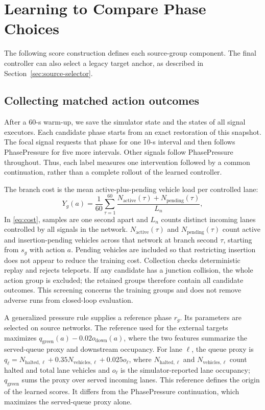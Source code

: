 \section{Learning to Compare Phase Choices}
The following score construction defines each source-group component. The final controller can also select a legacy target anchor, as described in Section~\ref{sec:source-selector}.
\subsection{Collecting matched action outcomes}
After a 60-s warm-up, we save the simulator state and the states of all signal executors. Each candidate phase starts from an exact restoration of this snapshot. The focal signal requests that phase for one 10-s interval and then follows PhasePressure for five more intervals. Other signals follow PhasePressure throughout. Thus, each label measures one intervention followed by a common continuation, rather than a complete rollout of the learned controller.

The branch cost is the mean active-plus-pending vehicle load per controlled lane:
\begin{equation}
 Y_g(a)=\frac{1}{60}\sum_{\tau=1}^{60}
 \frac{N_{\mathrm{active}}(\tau)+N_{\mathrm{pending}}(\tau)}{L_n},
 \label{eq:cost}
\end{equation}
In \eqref{eq:cost}, samples are one second apart and $L_n$ counts distinct incoming lanes controlled by all signals in the network. $N_{\mathrm{active}}(\tau)$ and $N_{\mathrm{pending}}(\tau)$ count active and insertion-pending vehicles across that network at branch second $\tau$, starting from $s_g$ with action $a$. Pending vehicles are included so that restricting insertion does not appear to reduce the training cost. Collection checks deterministic replay and rejects teleports. If any candidate has a junction collision, the whole action group is excluded; the retained groups therefore contain all candidate outcomes. This screening concerns the training groups and does not remove adverse runs from closed-loop evaluation.

A generalized pressure rule supplies a reference phase $r_g$. Its parameters are selected on source networks. The reference used for the external targets maximizes $q_{\mathrm{green}}(a)-0.02o_{\mathrm{down}}(a)$, where the two features summarize the served-queue proxy and downstream occupancy. For lane $\ell$, the queue proxy is $q_\ell=N_{\mathrm{halted},\ell}+0.35N_{\mathrm{vehicles},\ell}+0.025o_\ell$, where $N_{\mathrm{halted},\ell}$ and $N_{\mathrm{vehicles},\ell}$ count halted and total lane vehicles and $o_\ell$ is the simulator-reported lane occupancy; $q_{\mathrm{green}}$ sums the proxy over served incoming lanes. This reference defines the origin of the learned scores. It differs from the PhasePressure continuation, which maximizes the served-queue proxy alone.

